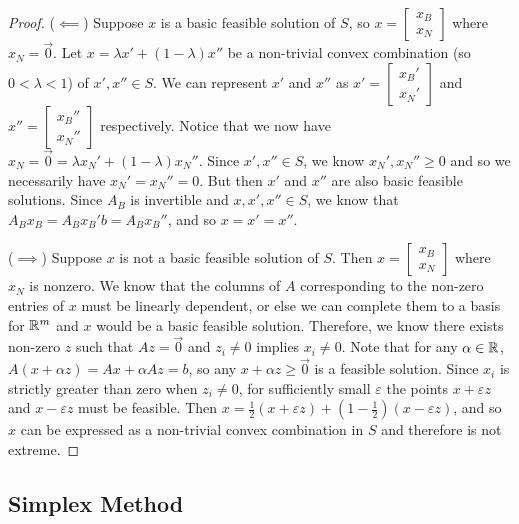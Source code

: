 \begin{proof}\proofbreak
    ($\impliedby$) Suppose $x$ is a basic feasible solution of $S$, so $x = \begin{bmatrix}
        x_B \\ x_N
    \end{bmatrix}$ where $x_N = \vec{0}$. Let $x = \lambda x' + (1 - \lambda) x''$ be a non-trivial convex combination (so $0 < \lambda < 1$) of $x', x'' \in S$. We can represent $x'$ and $x''$ as $x' = \begin{bmatrix} x_B' \\ x_N' \end{bmatrix}$ and $x'' = \begin{bmatrix} x_B'' \\ x_N'' \end{bmatrix}$ respectively. Notice that we now have $x_N = \vec{0} = \lambda x_N' + (1 - \lambda)x_N''$. Since $x', x'' \in S$, we know $x_N', x_N'' \geq 0$ and so we necessarily have $x_N' = x_N'' = 0$. But then $x'$ and $x''$ are also basic feasible solutions. Since $A_{B}$ is invertible and $x, x', x'' \in S$, we know that $A_{B}x_B = A_{B}x_B'b = A_{B}x_B''$, and so $x = x' = x''$.

    ($\implies$) Suppose $x$ is not a basic feasible solution of $S$. Then $x = \begin{bmatrix}
        x_B \\ x_N
    \end{bmatrix}$ where $x_N$ is nonzero. We know that the columns of $A$ corresponding to the non-zero entries of $x$ must be linearly dependent, or else we can complete them to a basis for $\mathbb{R}^m$ and $x$ would be a basic feasible solution. Therefore, we know there exists non-zero $z$ such that $Az = \vec{0}$ and $z_i \neq 0$ implies $x_i \neq 0$. Note that for any $\alpha \in \mathbb{R}$, $A(x + \alpha z) = Ax + \alpha Az = b$, so any $x + \alpha z \geq \vec{0}$ is a feasible solution. Since $x_i$ is strictly greater than zero when $z_i \neq 0$, for sufficiently small $\varepsilon$ the points $x + \varepsilon z$ and $x - \varepsilon z$ must be feasible. Then $x = \frac{1}{2}\left(x + \varepsilon z\right) + \left(1 - \frac{1}{2}\right)\left(x - \varepsilon z\right)$, and so $x$ can be expressed as a non-trivial convex combination in $S$ and therefore is not extreme.
\end{proof}

\subsection{Simplex Method}

